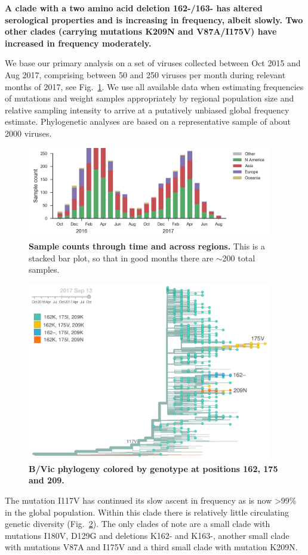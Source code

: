 \documentclass[11pt,oneside,letterpaper]{article}
\newcommand{\FIG}[1]{Fig.~\ref{#1}}
\begin{document}
\textbf{A clade with a two amino acid deletion 162-/163- has altered
serological properties and is increasing in frequency, albeit slowly.
Two other clades (carrying mutations K209N and V87A/I175V) have
increased in frequency moderately.}

We base our primary analysis on a set of viruses collected between Oct
2015 and Aug 2017, comprising between 50 and 250 viruses per month
during relevant months of 2017, see \FIG{vic_counts}. We use all available data when
estimating frequencies of mutations and weight samples appropriately by
regional population size and relative sampling intensity to arrive at a
putatively unbiased global frequency estimate. Phylogenetic analyses are
based on a representative sample of about 2000 viruses.

\begin{figure}[H]
  \centering
  \includegraphics[width=0.95\textwidth]{../figures/sep-2017/vic_counts.png}
  \caption{\textbf{Sample counts through time and across regions.}
  This is a stacked bar plot, so that in good months there are $\sim$200 total samples.
  }
  \label{vic_counts}
\end{figure}
\clearpage
\begin{figure}[H]
  \centering
  \includegraphics[width=0.95\textwidth]{../figures/sep-2017/vic_tree.png}
  \caption{\textbf{B/Vic phylogeny colored by genotype at positions 162, 175 and 209.}
  }
  \label{vic_tree}
\end{figure}
The mutation I117V has continued its slow ascent in frequency as is now
\textgreater{}99\% in the global population. Within this clade there is
relatively little circulating genetic diversity (\FIG{vic_tree}). The only clades of note
are a small clade with mutations I180V, D129G and deletions K162- and
K163-, another small clade with mutations V87A and I175V and a third
small clade with mutation K209N.
\end{document}
